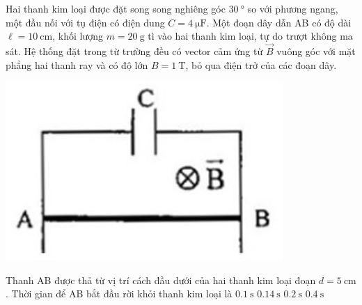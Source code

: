 \begin{ex}
	Hai thanh kim loại được đặt song song nghiêng góc $\SI{30}{\degree}$ so với phương ngang, một đầu nối với tụ điện có điện dung $C=\SI{4}{\micro\farad}$. Một đoạn dây dẫn AB có độ dài $\ell=\SI{10}{\centi\meter}$, khối lượng $m=\SI{20}{\gram}$ tì vào hai thanh kim loại, tự do trượt không ma sát. Hệ thống đặt trong từ trường đều có vector cảm ứng từ $\vec{B}$ vuông góc với mặt phẳng hai thanh ray và có độ lớn $B=\SI{1}{\tesla}$, bỏ qua điện trở của các đoạn dây.
	\begin{center}
		\includegraphics[width=0.3\linewidth]{figs/VN12-Y24-PH-SYL-022P-7}
	\end{center}
	Thanh AB được thả từ vị trí cách đầu dưới của hai thanh kim loại đoạn $d=\SI{5}{\centi\meter}$. Thời gian để AB bắt đầu rời khỏi thanh kim loại là
	\choice
	{$\SI{0.1}{\second}$}
	{\True $\SI{0.14}{\second}$}
	{$\SI{0.2}{\second}$}
	{$\SI{0.4}{\second}$}
\end{ex}
